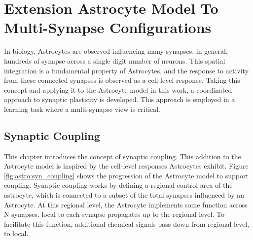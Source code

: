 \chapter{Extension Astrocyte Model To Multi-Synapse
  Configurations} \label{chapter:obj3}

In biology, Astrocytes are observed influencing many synapses, in general,
hundreds of synapse across a single digit number of neurons. This spatial
integration is a fundamental property of Astrocytes, and the response to
activity from these connected synapses is observed as a cell-level \ca
response. Taking this concept and applying it to the Astrocyte model
in this work, a coordinated approach to synaptic plasticity is developed. This
approach is employed in a learning task where a multi-synapse view is critical.



  


\section{Synaptic Coupling}
This chapter introduces the concept of synaptic coupling. This addition to the
Astrocyte model is inspired by the cell-level \ca responses Astrocytes
exhibit. Figure \ref{fig:astro:syn_coupling} shows the progression of the
Astrocyte model to support coupling. Synaptic coupling works by defining a
regional control area of the astrocyte, which is connected to a subset of the
total synapses influenced by an Astrocyte. At this regional level, the Astrocyte
implements some function across N synapses. \ca local to each synapse propagates
up to the regional level. To facilitate this function, additional chemical
signals pass down from regional level, to local.

